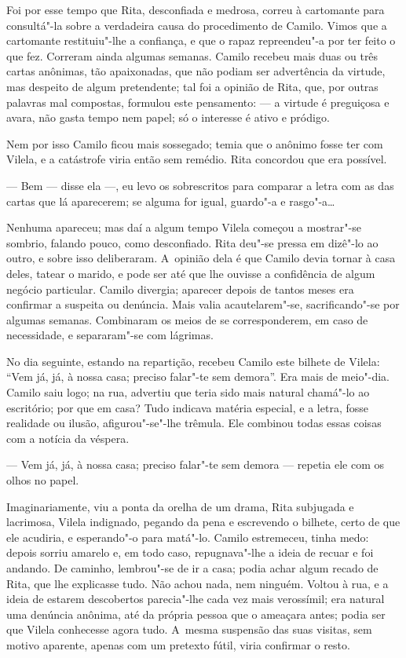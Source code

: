 \begin{linenumbers}
Foi por esse tempo que Rita, desconfiada e medrosa, correu à cartomante
para consultá"-la sobre a verdadeira causa do procedimento de Camilo.
Vimos que a cartomante restituiu"-lhe a confiança, e que o rapaz
repreendeu"-a por ter feito o que fez. Correram ainda algumas semanas.
Camilo recebeu mais duas ou três cartas anônimas, tão apaixonadas, que
não podiam ser advertência da virtude, mas despeito de algum
pretendente; tal foi a opinião de Rita, que, por outras palavras mal
compostas, formulou este pensamento: --- a virtude é preguiçosa e avara,
não gasta tempo nem papel; só o interesse é ativo e pródigo.

Nem por isso Camilo ficou mais sossegado; temia que o anônimo fosse ter
com Vilela, e a catástrofe viria então sem remédio. Rita concordou que
era possível.

--- Bem --- disse ela ---, eu levo os sobrescritos para comparar a letra
com as das cartas que lá aparecerem; se alguma for igual, guardo"-a e
rasgo"-a\ldots{}

Nenhuma apareceu; mas daí a algum tempo Vilela começou a mostrar"-se
sombrio, falando pouco, como desconfiado. Rita deu"-se pressa em dizê"-lo
ao outro, e sobre isso deliberaram. A~opinião dela é que Camilo devia
tornar à casa deles, tatear o marido, e pode ser até que lhe ouvisse a
confidência de algum negócio particular. Camilo divergia; aparecer
depois de tantos meses era confirmar a suspeita ou denúncia. Mais valia
acautelarem"-se, sacrificando"-se por algumas semanas. Combinaram os meios
de se corresponderem, em caso de necessidade, e separaram"-se com
lágrimas.

No dia seguinte, estando na repartição, recebeu Camilo este bilhete de
Vilela: ``Vem já, já, à nossa casa; preciso falar"-te sem demora''. Era
mais de meio"-dia. Camilo saiu logo; na rua, advertiu que teria sido mais
natural chamá"-lo ao escritório; por que em casa? Tudo indicava matéria
especial, e a letra, fosse realidade ou ilusão, afigurou"-se"-lhe trêmula.
Ele combinou todas essas coisas com a notícia da véspera.

--- Vem já, já, à nossa casa; preciso falar"-te sem demora --- repetia ele
com os olhos no papel.

Imaginariamente, viu a ponta da orelha de um drama, Rita subjugada e
lacrimosa, Vilela indignado, pegando da pena e escrevendo o bilhete,
certo de que ele acudiria, e esperando"-o para matá"-lo. Camilo
estremeceu, tinha medo: depois sorriu amarelo e, em todo caso,
repugnava"-lhe a ideia de recuar e foi andando. De caminho, lembrou"-se de
ir a casa; podia achar algum recado de Rita, que lhe explicasse tudo.
Não achou nada, nem ninguém. Voltou à rua, e a ideia de estarem
descobertos parecia"-lhe cada vez mais verossímil; era natural uma
denúncia anônima, até da própria pessoa que o ameaçara antes; podia ser
que Vilela conhecesse agora tudo. A~mesma suspensão das suas visitas,
sem motivo aparente, apenas com um pretexto fútil, viria confirmar o
resto.


\end{linenumbers}
